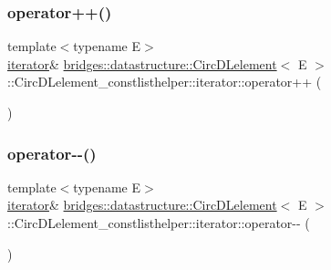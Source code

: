 \subsubsection{\texorpdfstring{operator++()}{operator++()}}
{\footnotesize\ttfamily template$<$typename E$>$ \\
\hyperlink{classbridges_1_1datastructure_1_1_circ_d_lelement_1_1_circ_d_lelement__constlisthelper_1_1iterator}{iterator}\& \hyperlink{classbridges_1_1datastructure_1_1_circ_d_lelement}{bridges\+::datastructure\+::\+Circ\+D\+Lelement}$<$ E $>$\+::Circ\+D\+Lelement\+\_\+constlisthelper\+::iterator\+::operator++ (\begin{DoxyParamCaption}{ }\end{DoxyParamCaption})\hspace{0.3cm}{\ttfamily [inline]}}

\mbox{\label{classbridges_1_1datastructure_1_1_circ_d_lelement_1_1_circ_d_lelement__constlisthelper_1_1iterator_a794e8d3566e860bf4c274d67b926c4a3}} 
\subsubsection{\texorpdfstring{operator-\/-\/()}{operator--()}\hspace{0.1cm}{\footnotesize\ttfamily [1/2]}}
{\footnotesize\ttfamily template$<$typename E$>$ \\
\hyperlink{classbridges_1_1datastructure_1_1_circ_d_lelement_1_1_circ_d_lelement__constlisthelper_1_1iterator}{iterator}\& \hyperlink{classbridges_1_1datastructure_1_1_circ_d_lelement}{bridges\+::datastructure\+::\+Circ\+D\+Lelement}$<$ E $>$\+::Circ\+D\+Lelement\+\_\+constlisthelper\+::iterator\+::operator-\/-\/ (\begin{DoxyParamCaption}{ }\end{DoxyParamCaption})\hspace{0.3cm}{\ttfamily [inline]}}

